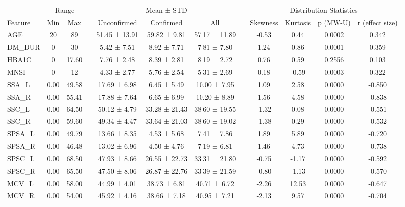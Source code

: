 \documentclass[fleqn,10pt]{wlscirep}
\begin{document}
\begin{table}[t]
\centering
\footnotesize
\begin{tabular}{lccccccccccc}
\toprule
& \multicolumn{2}{c}{Range} &&  \multicolumn{3}{c}{Mean ± STD} && \multicolumn{4}{c}{Distribution Statistics} \\       
\cline{2-3} \cline{5-7}  \cline{9-12}
Feature & Min & Max  && Unconfirmed & Confirmed & All &&  Skewness & Kurtosis & p (MW-U) & r (effect size) \\
\midrule
AGE & 20 & 89 && 51.45 ± 13.91 & 59.82 ± 9.81 & 57.17 ± 11.89 && -0.53 & 0.44 & 0.0002 & 0.342 \\
DM\_DUR & 0 & 30 && 5.42 ± 7.51 & 8.92 ± 7.71 & 7.81 ± 7.80 && 1.24 & 0.86 & 0.0001 & 0.359 \\
HBA1C & 0 & 17.60 && 7.76 ± 2.48 & 8.39 ± 2.81 & 8.19 ± 2.72 && 0.76 & 0.59 & 0.2556 & 0.103 \\
\midrule
MNSI & 0 & 12 && 4.33 ± 2.77 & 5.76 ± 2.54 & 5.31 ± 2.69 && 0.18 & -0.59 & 0.0003 & 0.322 \\
\midrule
SSA\_L & 0.00 & 49.58 &  & 17.69 ± 6.98 & 6.45 ± 5.49 & 10.00 ± 7.95 &  & 1.09 & 2.58 & 0.0000 & -0.850 \\
SSA\_R & 0.00 & 55.41 &  & 17.88 ± 7.64 & 6.65 ± 6.99 & 10.20 ± 8.89 &  & 1.56 & 4.58 & 0.0000 & -0.838 \\
SSC\_L & 0.00 & 64.50 &  & 50.12 ± 4.79 & 33.28 ± 21.43 & 38.60 ± 19.55 &  & -1.32 & 0.08 & 0.0000 & -0.551 \\
SSC\_R & 0.00 & 59.60 &  & 49.34 ± 4.47 & 33.64 ± 21.03 & 38.60 ± 19.02 &  & -1.38 & 0.29 & 0.0000 & -0.532 \\
SPSA\_L & 0.00 & 49.79 &  & 13.66 ± 8.35 & 4.53 ± 5.68 & 7.41 ± 7.86 &  & 1.89 & 5.89 & 0.0000 & -0.720 \\
SPSA\_R & 0.00 & 46.48 &  & 13.02 ± 6.96 & 4.50 ± 4.76 & 7.19 ± 6.81 &  & 1.46 & 4.73 & 0.0000 & -0.738 \\
SPSC\_L & 0.00 & 68.50 &  & 47.93 ± 8.66 & 26.55 ± 22.73 & 33.31 ± 21.80 &  & -0.75 & -1.17 & 0.0000 & -0.592 \\
SPSC\_R & 0.00 & 65.50 &  & 47.50 ± 8.06 & 26.87 ± 22.76 & 33.39 ± 21.59 &  & -0.80 & -1.13 & 0.0000 & -0.570 \\
MCV\_L & 0.00 & 58.00 &  & 44.99 ± 4.01 & 38.73 ± 6.81 & 40.71 ± 6.72 &  & -2.26 & 12.53 & 0.0000 & -0.647 \\
MCV\_R & 0.00 & 54.00 &  & 45.92 ± 4.16 & 38.66 ± 7.18 & 40.95 ± 7.21 &  & -2.13 & 9.57 & 0.0000 & -0.704 \\

\end{tabular}
\end{table}
\end{document}
